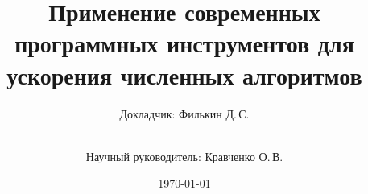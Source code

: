 \documentclass[ignoreonframetext,unicode,aspectratio=169]{beamer}
\title[Применение современных программных...]{Применение современных программных инструментов для ускорения численных алгоритмов}
\author[Филькин Д.\,С.]{Докладчик: Филькин Д.\,С.\and\\[0.5mm] Научный руководитель: Кравченко О.\,В.}
\institute[каф. Прикладная математика ФН-1]{группа ФН1-81Б}
\date{\today}
\begin{document}
	
	\begin{frame}[plain]
		\maketitle
	\end{frame}
	
%		
%		
%			
%		
\end{document}
